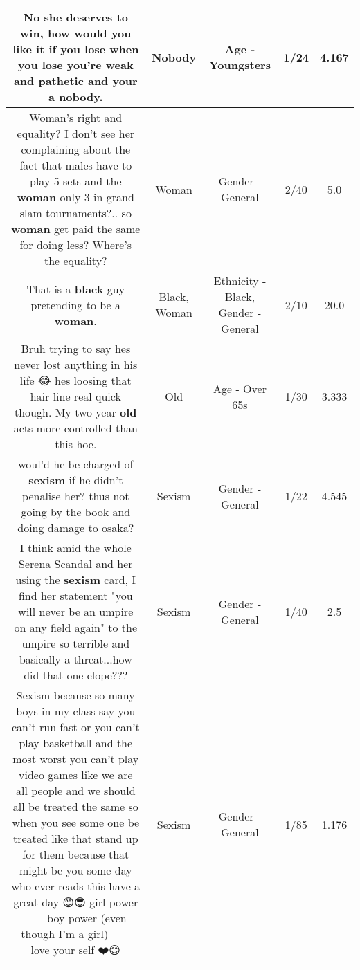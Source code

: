 \documentclass[11pt]{article}
\newlength\mylength
\begin{document}
\begin{center}
\begin{longtable}{|C{.65\mylength}|C{.30\mylength}|C{.12\mylength}|C{.12\mylength}|C{.12\mylength}|}
  \small No she deserves to win, how would you like it if you lose when you lose you're weak and pathetic and your a \textbf{nobody}.\normalsize   & Nobody & Age - Youngsters & 1/24 & 4.167 \\  \hline
  \small Woman's right and equality? I don't see her complaining about the fact that males have to play 5 sets and the \textbf{woman} only 3 in grand slam tournaments?.. so \textbf{woman} get paid the same for doing less? Where's the equality?\normalsize   & Woman & Gender - General & 2/40 & 5.0 \\  \hline
  \small That is a \textbf{black} guy pretending to be a \textbf{woman}.\normalsize   & Black, Woman & Ethnicity - Black, Gender - General & 2/10 & 20.0 \\  \hline
  \small Bruh trying to say hes never lost anything in his life 😂 hes loosing that hair line real quick though. My two year \textbf{old} acts more controlled than this hoe.\normalsize   & Old & Age - Over 65s & 1/30 & 3.333 \\  \hline
  \small woul'd  he be charged of \textbf{sexism} if he didn't penalise her? thus not going by the book and doing damage to osaka?\normalsize   & Sexism & Gender - General & 1/22 & 4.545 \\  \hline
  \small I think amid the whole Serena Scandal and her using the \textbf{sexism} card, I find her statement "you will never be an umpire on any field again" to the umpire so terrible and basically a threat...how did that one elope???\normalsize   & Sexism & Gender - General & 1/40 & 2.5 \\  \hline
  \small Sexism because so many boys in my class say you can't run fast or you can't play basketball and the most worst you can't play video games like we are all people and we should all be treated the same so when you see some one be treated like that stand up for them because that might be you some day who ever reads this have a great day 😊😎 girl power 💪🏾👩🏽👩🏾 boy power (even though I'm a girl) 💪🏾👦🏽👦🏾 love your self ❤️😊\normalsize   & Sexism & Gender - General & 1/85 & 1.176 \\  \hline

\end{longtable}
\end{center}
\end{document}
